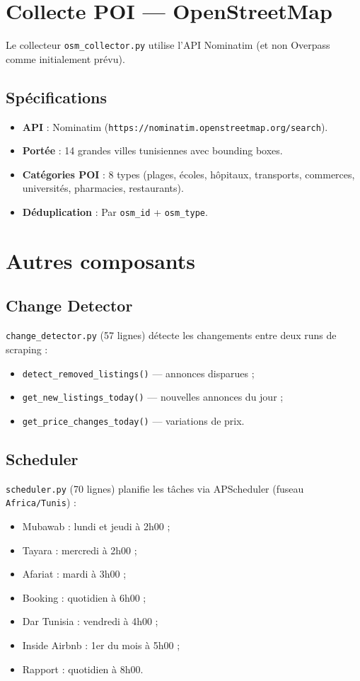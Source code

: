 \documentclass[12pt,a4paper]{report}
\begin{document}
\section{Collecte POI — OpenStreetMap}

Le collecteur \texttt{osm\_collector.py} utilise l'API Nominatim (et non Overpass comme initialement prévu).

\subsection{Spécifications}
\begin{itemize}
    \item \textbf{API} : Nominatim (\texttt{https://nominatim.openstreetmap.org/search}).
    \item \textbf{Portée} : 14 grandes villes tunisiennes avec bounding boxes.
    \item \textbf{Catégories POI} : 8 types (plages, écoles, hôpitaux, transports, commerces, universités, pharmacies, restaurants).
    \item \textbf{Déduplication} : Par \texttt{osm\_id} + \texttt{osm\_type}.
\end{itemize}

\section{Autres composants}

\subsection{Change Detector}
\texttt{change\_detector.py} (57 lignes) détecte les changements entre deux runs de scraping :
\begin{itemize}
    \item \texttt{detect\_removed\_listings()} — annonces disparues ;
    \item \texttt{get\_new\_listings\_today()} — nouvelles annonces du jour ;
    \item \texttt{get\_price\_changes\_today()} — variations de prix.
\end{itemize}

\subsection{Scheduler}
\texttt{scheduler.py} (70 lignes) planifie les tâches via APScheduler (fuseau \texttt{Africa/Tunis}) :
\begin{itemize}
    \item Mubawab : lundi et jeudi à 2h00 ;
    \item Tayara : mercredi à 2h00 ;
    \item Afariat : mardi à 3h00 ;
    \item Booking : quotidien à 6h00 ;
    \item Dar Tunisia : vendredi à 4h00 ;
    \item Inside Airbnb : 1er du mois à 5h00 ;
    \item Rapport : quotidien à 8h00.
\end{itemize}
\end{document}

